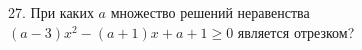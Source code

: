 27. При каких $a$ множество решений неравенства $(a-3)x^2-(a+1)x+a+1\geqslant0$ является отрезком?\\

